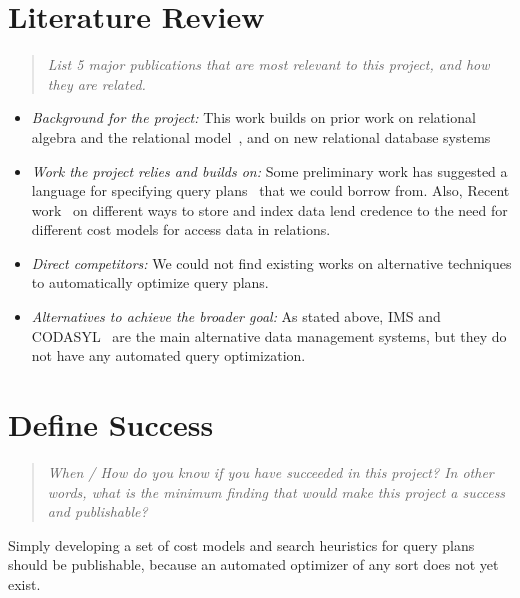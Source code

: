 \documentclass{proc}
\begin{document}
\section{Literature Review}
\begin{quote}
\emph{List 5 major publications that are most relevant to this project, and how they are related.}
\end{quote}

\begin{itemize}
\item \emph{Background for the project:} This work builds on prior work on relational algebra and the relational model~\cite{codd1970relational}, and on new relational database systems~\cite{stonebraker1976design,astrahan1976system}

\item \emph{Work the project relies and builds on: } Some preliminary work has suggested a language for specifying query plans~\cite{lorie1979access} that we could borrow from.  Also, Recent work~\cite{bayer2002organization} on different ways to store and index data lend credence to the need for different cost models for access data in relations.

\item \emph{Direct competitors: } We could not find existing works on alternative techniques to automatically optimize query plans.

\item \emph{Alternatives to achieve the broader goal: } As stated above, IMS and CODASYL~\cite{taylor1976codasyl} are the main alternative data management systems, but they do not have any automated query optimization.

 \end{itemize}


\section{Define Success}
\begin{quote}
\emph{When / How do you know if you have succeeded in this project?
In other words, what is the minimum finding that would make this project a success and publishable?}
\end{quote}

Simply developing a set of cost models and search heuristics for query plans should be publishable, because an automated optimizer of any sort does not yet exist.  



\end{document}
